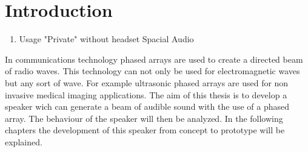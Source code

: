\chapter{Introduction}

\begin{enumerate}
  \item Usage
  \subitem "Private" without headset
  \subitem Spacial Audio
\end{enumerate}

In communications technology phased arrays are used to create a directed beam of radio waves. This technology can not only be used for electromagnetic waves but any sort of wave. For example ultrasonic phased arrays are used for non invasive medical imaging applications.\p
The aim of this thesis is to develop a speaker wich can generate a beam of audible sound with the use of a phased array. The behaviour of the speaker will then be analyzed.\p
In the following chapters the development of this speaker from concept to prototype will be explained.